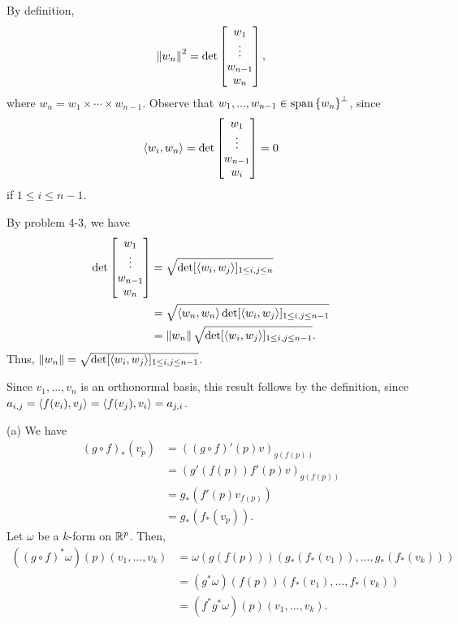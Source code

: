 \documentclass[11pt]{scrartcl}
\begin{document}
\begin{problem*}[4-10]
\end{problem*}
By definition, 
$$
    \left\lVert w_n \right\rVert^2 = \det\begin{bmatrix} w_1\\ \vdots \\ w_{n - 1}\\ w_n \end{bmatrix},
$$
where $w_n = w_1\times\cdots\times w_{n - 1}$.
Observe that $w_1, ..., w_{n - 1}\in \operatorname{span}\left\{ w_n \right\}^\perp$, since 
$$
    \langle w_i, w_n \rangle = \det\begin{bmatrix} w_1\\ \vdots\\ w_{n - 1}\\ w_i \end{bmatrix} = 0
$$ 
if $1\le i\le n - 1$.

By problem 4-3, we have 
\begin{align*}
    \det\begin{bmatrix} w_1\\ \vdots \\ w_{n - 1}\\ w_n \end{bmatrix} 
    &= 
    \sqrt{\det[\langle w_i, w_j \rangle]_{1\le i, j\le n}} \\
    &= 
    \sqrt{\langle w_n, w_n \rangle\det[\langle w_i, w_j \rangle]_{1\le i, j\le n - 1}} \\
    &=
    \left\lVert w_n \right\rVert\sqrt{\det[\langle w_i, w_j \rangle]_{1\le i, j\le n - 1}}.
\end{align*}
Thus, $\left\lVert w_n \right\rVert = \sqrt{\det[\langle w_i, w_j \rangle]_{1\le i, j\le n - 1}}$.

\begin{problem*}[4-11]
\end{problem*}
Since $v_1, ..., v_n$ is an orthonormal basis, this result follows by the definition, 
since $a_{i, j} = \langle f(v_i), v_j \rangle = \langle f(v_j), v_i \rangle = a_{j, i}$.

\begin{problem*}[4-13]
\end{problem*}
(a) We have 
\begin{align*}
    (g\circ f)_*(v_p) 
    &= 
    ((g\circ f)'(p)v)_{g(f(p))}\\
    &=
    (g'(f(p))f'(p)v)_{g(f(p))} \\
    &=
    g_*(f'(p)v_{f(p)}) \\
    &=
    g_*(f_*(v_p)).
\end{align*}
Let $\omega$ be a $k$-form on $\mathbb R^p$.
Then,
\begin{align*}
    ((g\circ f)^*\omega)(p)(v_1, ..., v_k) 
    &=
    \omega(g(f(p)))(g_*(f_*(v_1)), ..., g_*(f_*(v_k))) \\
    &=
    (g^*\omega)(f(p))(f_*(v_1), ..., f_*(v_k)) \\
    &=
    (f^*g^*\omega)(p)(v_1, ..., v_k).
\end{align*}
\end{document}
